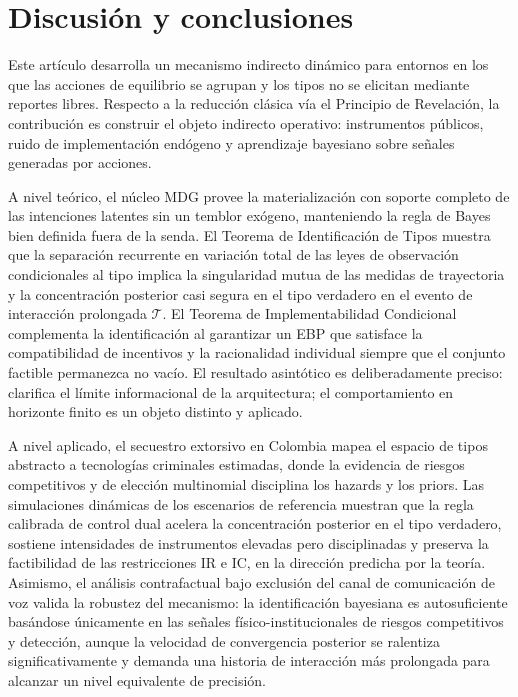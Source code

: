 \documentclass[review,authoryear,12pt]{elsarticle}
\theoremstyle{plain}
\theoremstyle{definition}
\newcommand{\1}{\mathbf{1}}
\begin{document}
\section{Discusión y conclusiones}\label{sec:conclusiones}

Este artículo desarrolla un mecanismo indirecto dinámico para entornos en los que las acciones de equilibrio se agrupan y los tipos no se elicitan mediante reportes libres. Respecto a la reducción clásica vía el Principio de Revelación, la contribución es construir el objeto indirecto operativo: instrumentos públicos, ruido de implementación endógeno y aprendizaje bayesiano sobre señales generadas por acciones.

A nivel teórico, el núcleo MDG provee la materialización con soporte completo de las intenciones latentes sin un temblor exógeno, manteniendo la regla de Bayes bien definida fuera de la senda. El Teorema de Identificación de Tipos muestra que la separación recurrente en variación total de las leyes de observación condicionales al tipo implica la singularidad mutua de las medidas de trayectoria y la concentración posterior casi segura en el tipo verdadero en el evento de interacción prolongada $\mathcal{T}$. El Teorema de Implementabilidad Condicional complementa la identificación al garantizar un EBP que satisface la compatibilidad de incentivos y la racionalidad individual siempre que el conjunto factible permanezca no vacío. El resultado asintótico es deliberadamente preciso: clarifica el límite informacional de la arquitectura; el comportamiento en horizonte finito es un objeto distinto y aplicado.

A nivel aplicado, el secuestro extorsivo en Colombia mapea el espacio de tipos abstracto a tecnologías criminales estimadas, donde la evidencia de riesgos competitivos y de elección multinomial disciplina los hazards y los priors. Las simulaciones dinámicas de los escenarios de referencia muestran que la regla calibrada de control dual acelera la concentración posterior en el tipo verdadero, sostiene intensidades de instrumentos elevadas pero disciplinadas y preserva la factibilidad de las restricciones IR e IC, en la dirección predicha por la teoría. Asimismo, el análisis contrafactual bajo exclusión del canal de comunicación de voz valida la robustez del mecanismo: la identificación bayesiana es autosuficiente basándose únicamente en las señales físico-institucionales de riesgos competitivos y detección, aunque la velocidad de convergencia posterior se ralentiza significativamente y demanda una historia de interacción más prolongada para alcanzar un nivel equivalente de precisión.
\end{document}
